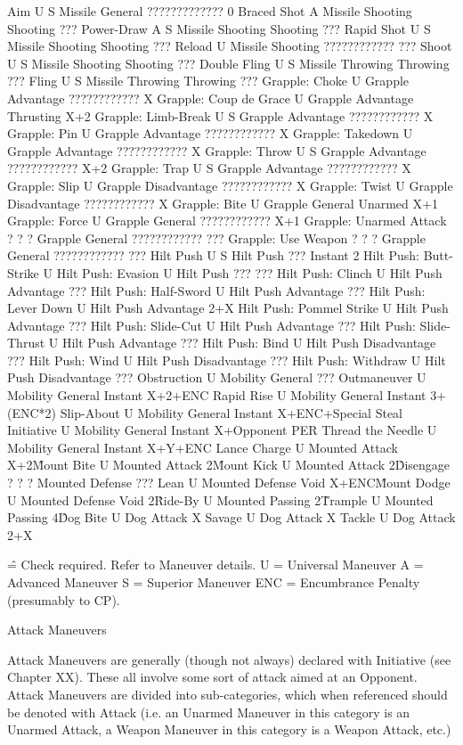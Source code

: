 \documentclass[oneside,11pt,english]{book}
\begin{document}
Aim U S Missile General ????????????? 0 
Braced Shot A Missile Shooting Shooting ???
Power-Draw A S Missile Shooting Shooting ??? 
Rapid Shot U S Missile Shooting Shooting ??? 
Reload U Missile Shooting ???????????? ??? 
Shoot U S Missile Shooting Shooting ??? 
Double Fling U S Missile Throwing Throwing ??? 
Fling U S Missile Throwing Throwing ??? 
Grapple: Choke U Grapple Advantage ???????????? X 
Grapple: Coup de Grace U Grapple Advantage Thrusting X+2 
Grapple: Limb-Break U S Grapple Advantage ???????????? X 
Grapple: Pin U Grapple Advantage ???????????? X 
Grapple: Takedown U Grapple Advantage ???????????? X 
Grapple: Throw U S Grapple Advantage ???????????? X+2 
Grapple: Trap U S Grapple Advantage ???????????? X 
Grapple: Slip U Grapple Disadvantage ???????????? X 
Grapple: Twist U Grapple Disadvantage ???????????? X 
Grapple: Bite U Grapple General Unarmed X+1 
Grapple: Force U Grapple General ???????????? X+1 
Grapple: Unarmed Attack ? ? ? Grapple General ???????????? ??? 
Grapple: Use Weapon ? ? ? Grapple General ???????????? ??? 
Hilt Push U S Hilt Push ??? Instant 2 
Hilt Push: Butt-Strike U 
Hilt Push: Evasion U Hilt Push ??? ??? 
Hilt Push: Clinch U Hilt Push Advantage ??? 
Hilt Push: Half-Sword U Hilt Push Advantage ??? 
Hilt Push: Lever Down U Hilt Push Advantage 2+X 
Hilt Push: Pommel Strike U Hilt Push Advantage ??? 
Hilt Push: Slide-Cut U Hilt Push Advantage ??? 
Hilt Push: Slide-Thrust U Hilt Push Advantage ??? 
Hilt Push: Bind U Hilt Push Disadvantage ??? 
Hilt Push: Wind U Hilt Push Disadvantage ??? 
Hilt Push: Withdraw U Hilt Push Disadvantage ??? 
Obstruction U Mobility General ??? 
Outmaneuver U Mobility General Instant X+2+ENC 
Rapid Rise U Mobility General Instant 3+(ENC*2) 
Slip-About U Mobility General Instant X+ENC+Special 
Steal Initiative U Mobility General Instant X+Opponent PER 
Thread the Needle U Mobility General Instant X+Y+ENC 
Lance Charge U Mounted Attack X+2\^ 
Mount Bite U Mounted Attack 2\^ 
Mount Kick U Mounted Attack 2\^ 
Disengage ? ? ? Mounted Defense ??? 
Lean U Mounted Defense Void X+ENC\^ 
Mount Dodge U Mounted Defense Void 2\^ 
Ride-By U Mounted Passing 2\^ 
Trample U Mounted Passing 4\^ 
Dog Bite U Dog Attack X 
Savage U Dog Attack X 
Tackle U Dog Attack 2+X 

\^ = Check required. Refer to Maneuver details. 
U = Universal Maneuver
A = Advanced Maneuver 
S = Superior Maneuver 
ENC = Encumbrance Penalty (presumably to CP). 

Attack Maneuvers

Attack Maneuvers are generally (though not always) declared with Initiative (see Chapter XX). These all 
involve some sort of attack aimed at an Opponent. Attack Maneuvers are divided into sub-categories, 
which when referenced should be denoted with Attack (i.e. an Unarmed Maneuver in this category is an 
Unarmed Attack, a Weapon Maneuver in this category is a Weapon Attack, etc.) 
\end{document}

